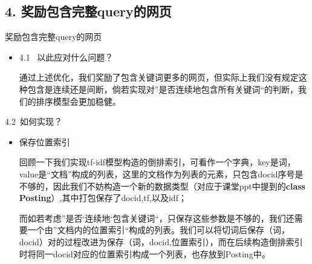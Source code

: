 \documentclass[12pt]{beamer}
\begin{document}
\subsection{4. 奖励包含完整query的网页} %
\begin{frame}{奖励包含完整query的网页}
\begin{itemize}
\item 4.1  以此应对什么问题？

通过上述优化，我们奖励了包含关键词更多的网页，\alert{但实际上我们没有规定这种包含是连续还是间断}，倘若实现\alert{对”是否连续地包含所有关键词“的判断}，我们的排序模型会更加稳健。
\end{itemize}
\end{frame}
\begin{frame}{4.2 如何实现？}
\begin{itemize}
\item 保存位置索引

回顾一下我们实现tf-idf模型构造的倒排索引，可看作一个字典，key是词，value是“文档”构成的列表，这里的文档作为列表的元素，\alert{只包含docid序号是不够的}，因此我们不妨构造一个新的数据类型（对应于课堂ppt中提到的\textbf{class Posting}）,其中打包保存了\alert{docid,tf,以及idf}；

\alert{而如若考虑”是否‘连续地‘包含关键词“，只保存这些参数是不够的}，我们还需要一个由”文档内的位置索引“构成的列表。我们可以将切词后保存（词，docid）对的过程改进为保存\alert{（词，docid,位置索引）}，而在后续构造倒排索引时\alert{将同一docid对应的位置索引构成一个列表，也存放到Posting中。}

\end{itemize}
\end{frame}
\end{document}
